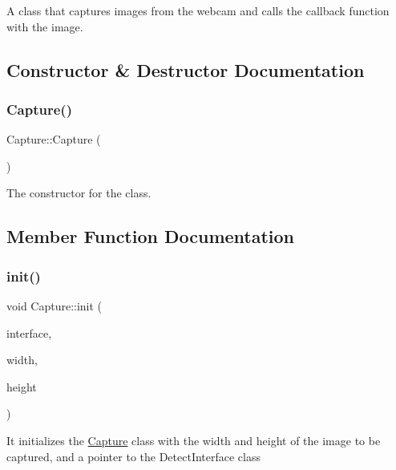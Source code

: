 A class that captures images from the webcam and calls the callback function with the image. 

\subsection{Constructor \& Destructor Documentation}
\mbox{\label{classGestureDetection_1_1Capture_a97036b5d271238bd4852da79a0091b57}} 
\subsubsection{\texorpdfstring{Capture()}{Capture()}}
{\footnotesize\ttfamily Capture\+::\+Capture (\begin{DoxyParamCaption}{ }\end{DoxyParamCaption})}

The constructor for the class. 

\subsection{Member Function Documentation}
\mbox{\label{classGestureDetection_1_1Capture_aaff420636b6bac6593789344cc990580}} 
\subsubsection{\texorpdfstring{init()}{init()}}
{\footnotesize\ttfamily void Capture\+::init (\begin{DoxyParamCaption}\item[{\hyperlink{classGestro_1_1CaptureAndDetectCallbackInterface}{Gestro\+::\+Capture\+And\+Detect\+Callback\+Interface} $\ast$}]{interface,  }\item[{int}]{width,  }\item[{int}]{height }\end{DoxyParamCaption})}

It initializes the \hyperlink{classGestureDetection_1_1Capture}{Capture} class with the width and height of the image to be captured, and a pointer to the Detect\+Interface class



